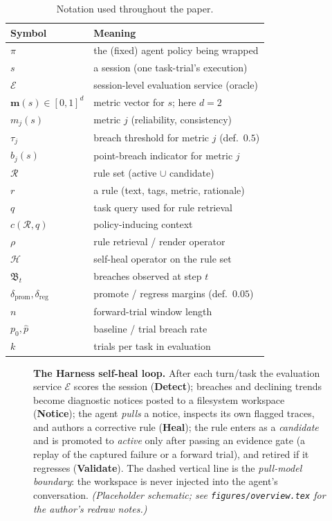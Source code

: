 \documentclass[letterpaper]{article} %
\newcommand{\Rset}{\mathcal{R}}                   %
\newcommand{\evalfn}{\mathcal{E}}                 %
\newcommand{\mvec}{\mathbf{m}}                    %
\newcommand{\Heal}{\mathcal{H}}                   %
\newcommand{\Breach}{\mathfrak{B}}                %
\newcommand{\dpromote}{\delta_{\mathrm{prom}}}
\newcommand{\dregress}{\delta_{\mathrm{reg}}}
\begin{document}
\begin{table}[t]
\centering\small
\caption{Notation used throughout the paper.}
\label{tab:notation}
\begin{tabular}{@{}ll@{}}
\toprule
Symbol & Meaning \\
\midrule
$\pi$ & the (fixed) agent policy being wrapped \\
$s$ & a session (one task-trial's execution) \\
$\evalfn$ & session-level evaluation service (oracle) \\
$\mvec(s)\in[0,1]^d$ & metric vector for $s$; here $d{=}2$ \\
$m_j(s)$ & metric $j$ (reliability, consistency) \\
$\tau_j$ & breach threshold for metric $j$ (def.\ $0.5$) \\
$b_j(s)$ & point-breach indicator for metric $j$ \\
$\Rset$ & rule set (active $\cup$ candidate) \\
$r$ & a rule (text, tags, metric, rationale) \\
$q$ & task query used for rule retrieval \\
$c(\Rset,q)$ & policy-inducing context \\
$\rho$ & rule retrieval / render operator \\
$\Heal$ & self-heal operator on the rule set \\
$\Breach_t$ & breaches observed at step $t$ \\
$\dpromote,\dregress$ & promote / regress margins (def.\ $0.05$) \\
$n$ & forward-trial window length \\
$p_0,\hat{p}$ & baseline / trial breach rate \\
$k$ & trials per task in evaluation \\
\bottomrule
\end{tabular}
\end{table}

\begin{figure}[t]
\centering
\resizebox{\textwidth}{!}{}
\caption{\textbf{The Harness self-heal loop.} After each turn/task the evaluation service
$\evalfn$ scores the session (\textbf{Detect}); breaches and declining trends become diagnostic
notices posted to a filesystem workspace (\textbf{Notice}); the agent \emph{pulls} a notice, inspects
its own flagged traces, and authors a corrective rule (\textbf{Heal}); the rule enters as a
\emph{candidate} and is promoted to \emph{active} only after passing an evidence gate (a replay of
the captured failure or a forward trial), and retired if it regresses (\textbf{Validate}). The
dashed vertical line is the \emph{pull-model boundary}: the workspace is never injected into the
agent's conversation. \textit{(Placeholder schematic; see \texttt{figures/overview.tex} for the
author's redraw notes.)}}
\label{fig:overview}
\end{figure}
\end{document}
